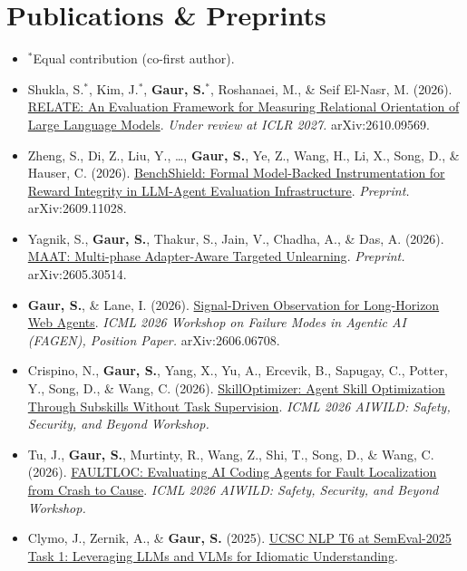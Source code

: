 \documentclass[letterpaper,11pt]{article}
\begin{document}
\section{Publications \& Preprints}
\begin{itemize}[leftmargin=0.25in, labelsep=0.08in]
  \small
  \item[] \footnotesize $^{*}$Equal contribution (co-first author). \vspace{2pt}
  \item[{[1]}] Shukla, S.$^{*}$, Kim, J.$^{*}$, \textbf{Gaur, S.}$^{*}$, Roshanaei, M., \& Seif El-Nasr, M. (2026).
  \href{https://arxiv.org/abs/2610.09569}{RELATE: An Evaluation Framework for Measuring Relational Orientation of Large Language Models}.
  \textit{Under review at ICLR 2027.} arXiv:2610.09569.
  \item[{[2]}] Zheng, S., Di, Z., Liu, Y., \ldots, \textbf{Gaur, S.}, Ye, Z., Wang, H., Li, X., Song, D., \& Hauser, C. (2026).
  \href{https://arxiv.org/abs/2609.11028}{BenchShield: Formal Model-Backed Instrumentation for Reward Integrity in LLM-Agent Evaluation Infrastructure}.
  \textit{Preprint.} arXiv:2609.11028.
  \item[{[3]}] Yagnik, S., \textbf{Gaur, S.}, Thakur, S., Jain, V., Chadha, A., \& Das, A. (2026).
  \href{https://arxiv.org/abs/2605.30514}{MAAT: Multi-phase Adapter-Aware Targeted Unlearning}.
  \textit{Preprint.} arXiv:2605.30514.
  \item[{[4]}] \textbf{Gaur, S.}, \& Lane, I. (2026).
  \href{https://arxiv.org/abs/2606.06708}{Signal-Driven Observation for Long-Horizon Web Agents}.
  \textit{ICML 2026 Workshop on Failure Modes in Agentic AI (FAGEN), Position Paper.} arXiv:2606.06708.
  \item[{[5]}] Crispino, N., \textbf{Gaur, S.}, Yang, X., Yu, A., Ercevik, B., Sapugay, C., Potter, Y., Song, D., \& Wang, C. (2026).
  \href{https://openreview.net/forum?id=nZYF0aPAMP}{SkillOptimizer: Agent Skill Optimization Through Subskills Without Task Supervision}.
  \textit{ICML 2026 AIWILD: Safety, Security, and Beyond Workshop.}
  \item[{[6]}] Tu, J., \textbf{Gaur, S.}, Murtinty, R., Wang, Z., Shi, T., Song, D., \& Wang, C. (2026).
  \href{https://openreview.net/forum?id=3q6yWfaQ8R}{FAULTLOC: Evaluating AI Coding Agents for Fault Localization from Crash to Cause}.
  \textit{ICML 2026 AIWILD: Safety, Security, and Beyond Workshop.}
  \item[{[7]}] Clymo, J., Zernik, A., \& \textbf{Gaur, S.} (2025).
  \href{https://aclanthology.org/2025.semeval-1.274/}{UCSC NLP T6 at SemEval-2025 Task 1: Leveraging LLMs and VLMs for Idiomatic Understanding}.

\end{itemize}
\end{document}
